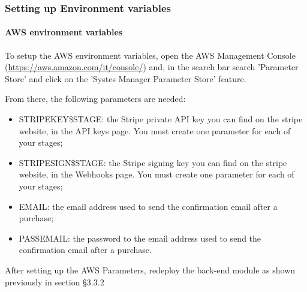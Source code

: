 \subsubsection{Setting up Environment variables}

\paragraph{AWS environment variables}
To setup the AWS environment variables, open the AWS Management Console (\url{https://aws.amazon.com/it/console/}) and, in the search bar search 'Parameter Store' and click on the 'Systes Manager Parameter Store' feature.

From there, the following parameters are needed:

\begin{itemize}
\item STRIPE\textunderscore KEY\textunderscore \$STAGE: the Stripe private API key you can find on the stripe website, in the API keys page. You must create one parameter for each of your stages;
\item STRIPE\textunderscore SIGN\textunderscore \$STAGE: the Stripe signing key you can find on the stripe website, in the Webhooks page. You must create one parameter for each of your stages;
\item EMAIL: the email address used to send the confirmation email after a purchase;
\item PASS\textunderscore EMAIL: the password to the email address used to send the confirmation email after a purchase.
\end{itemize}
 
After setting up the AWS Parameters, redeploy the back-end module as shown previously in section §3.3.2

